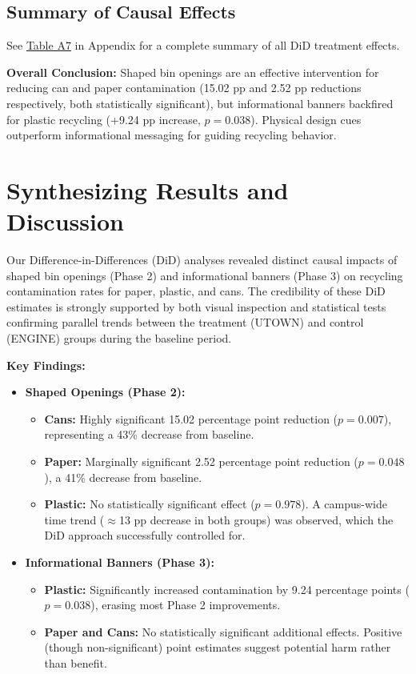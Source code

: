 \documentclass[12pt]{article}
\begin{document}
\subsection{Summary of Causal Effects}

See \hyperref[tab:summary]{Table A7} in Appendix for a complete summary of all DiD treatment effects.

\textbf{Overall Conclusion:} Shaped bin openings are an effective intervention for reducing can and paper contamination (15.02 pp and 2.52 pp reductions respectively, both statistically significant), but informational banners backfired for plastic recycling (+9.24 pp increase, $p = 0.038$). Physical design cues outperform informational messaging for guiding recycling behavior.

\section{Synthesizing Results and Discussion}

Our Difference-in-Differences (DiD) analyses revealed distinct causal impacts of shaped bin openings (Phase 2) and informational banners (Phase 3) on recycling contamination rates for paper, plastic, and cans. The credibility of these DiD estimates is strongly supported by both visual inspection and statistical tests confirming parallel trends between the treatment (UTOWN) and control (ENGINE) groups during the baseline period.

\textbf{Key Findings:}

\begin{itemize}
    \item \textbf{Shaped Openings (Phase 2):}
    \begin{itemize}
        \item \textbf{Cans:} Highly significant 15.02 percentage point reduction ($p = 0.007$), representing a 43\% decrease from baseline.
        \item \textbf{Paper:} Marginally significant 2.52 percentage point reduction ($p = 0.048$), a 41\% decrease from baseline.
        \item \textbf{Plastic:} No statistically significant effect ($p = 0.978$). A campus-wide time trend ($\approx$13 pp decrease in both groups) was observed, which the DiD approach successfully controlled for.
    \end{itemize}

    \item \textbf{Informational Banners (Phase 3):}
    \begin{itemize}
        \item \textbf{Plastic:} Significantly increased contamination by 9.24 percentage points ($p = 0.038$), erasing most Phase 2 improvements.
        \item \textbf{Paper and Cans:} No statistically significant additional effects. Positive (though non-significant) point estimates suggest potential harm rather than benefit.
    \end{itemize}
\end{itemize}
\end{document}
